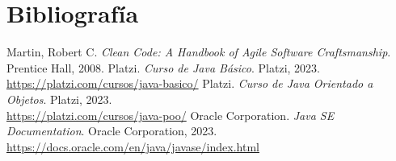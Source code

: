 \documentclass[executivepaper]{article}
\begin{document}
\newpage
\section{Bibliografía}
\begin{thebibliography}{9}
 Martin, Robert C. \textit{Clean Code: A Handbook of Agile Software Craftsmanship}. Prentice Hall, 2008.
 Platzi. \textit{Curso de Java Básico}. Platzi, 2023.\\ \url{https://platzi.com/cursos/java-basico/}
 Platzi. \textit{Curso de Java Orientado a Objetos}. Platzi, 2023.\\ \url{https://platzi.com/cursos/java-poo/}
 Oracle Corporation. \textit{Java SE Documentation}. Oracle Corporation, 2023.\\ \url{https://docs.oracle.com/en/java/javase/index.html}
\end{thebibliography}
\end{document}
